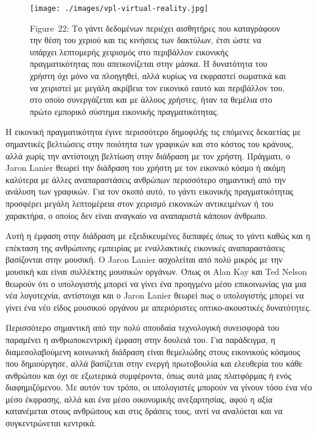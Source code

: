 \documentclass[
]{article}
\begin{document}
\leavevmode{}%
\begin{figure}
\hypertarget{fig:vpl-virtual-reality}{%
\centering
\texttt{[image: ./images/vpl-virtual-reality.jpg]}
\caption{Figure~22: Το γάντι δεδομένων περιέχει αισθητήρες που
καταγράφουν την θέση του χεριού και τις κινήσεις των δακτύλων, έτσι ώστε
να υπάρχει λεπτομερής χειρισμός στο περιβάλλον εικονικής πραγματικότητας
που απεικονίζεται στην μάσκα. Η δυνατότητα του χρήστη όχι μόνο να
πλοηγηθεί, αλλά κυρίως να εκφραστεί σωματικά και να χειριστεί με μεγάλη
ακρίβεια τον εικονικό εαυτό και περιβάλλον του, στο οποίο συνεργάζεται
και με άλλους χρήστες, ήταν τα θεμέλια στο πρώτο εμπορικό σύστημα
εικονικής πραγματικότητας.}\label{fig:vpl-virtual-reality}
}
\end{figure}

Η εικονική πραγματικότητα έγινε περισσότερο δημοφιλής τις επόμενες
δεκαετίας με σημαντικές βελτιώσεις στην ποιότητα των γραφικών και στο
κόστος του κράνους, αλλά χωρίς την αντίστοιχη βελτίωση στην διάδραση με
τον χρήστη. Πράγματι, ο Jaron Lanier θεωρεί την διάδραση του χρήστη με
τον εικονικό κόσμο ή ακόμη καλύτερα με άλλες αναπαραστάσεις ανθρώπων
περισσότερο σημαντική από την ανάλυση των γραφικών. Για τον σκοπό αυτό,
το γάντι εικονικής πραγματικότητας προσφέρει μεγάλη λεπτομέρεια στον
χειρισμό εικονικών αντικειμένων ή του χαρακτήρα, ο οποίος δεν είναι
αναγκαίο να αναπαριστά κάποιον άνθρωπο.

Αυτή η έμφαση στην διάδραση με εξειδικευμένες διεπαφές όπως το γάντι
καθώς και η επέκταση της ανθρώπινης εμπειρίας με εναλλακτικές εικονικές
αναπαραστάσεις βασίζονται στην μουσική. O Jaron Lanier ασχολείται από
πολύ μικρός με την μουσική και είναι συλλέκτης μουσικών οργάνων. Όπως οι
Alan Kay και Ted Nelson θεωρούν ότι ο υπολογιστής μπορεί να γίνει ένα
προηγμένο μέσο επικοινωνίας για μια νέα λογοτεχνία, αντίστοιχα και ο
Jaron Lanier θεωρεί πως ο υπολογιστής μπορεί να γίνει ένα νέο είδος
μουσικού οργάνου με απεριόριστες οπτικο-ακουστικές δυνατότητες.

Περισσότερο σημαντική από την πολύ σπουδαία τεχνολογική συνεισφορά του
παραμένει η ανθρωποκεντρική έμφαση στην δουλειά του. Για παράδειγμα, η
διαμεσολαβούμενη κοινωνική διάδραση είναι θεμελιώδης στους εικονικούς
κόσμους που δημιούργησε, αλλά βασίζεται στην ενεργή πρωτοβουλία και
ελευθερία του κάθε ανθρώπου και όχι σε εξωτερικά συμφέροντα, όπως αυτά
μιας πλατφόρμας ή ενός διαφημιζόμενου. Με αυτόν τον τρόπο, οι
υπολογιστές μπορούν να γίνουν τόσο ένα νέο μέσο έκφρασης, αλλά και ένα
μέσο οικονομικής ανεξαρτησίας, αφού η αξία κατανέμεται στους ανθρώπους
και στις δράσεις τους, αντί να αναλύεται και να συγκεντρώνεται κεντρικά.
\end{document}
